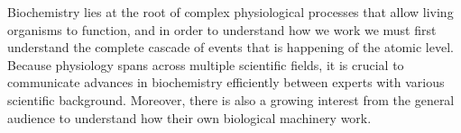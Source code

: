 






Biochemistry lies at the root of complex physiological processes that allow living organisms to function, and in order to understand how we work we must first understand the complete cascade of events that is happening of the atomic level.
Because physiology spans across multiple scientific fields, it is crucial to communicate advances in biochemistry efficiently between experts with various scientific background.
Moreover, there is also a growing interest from the general audience to understand how their own biological machinery work.

